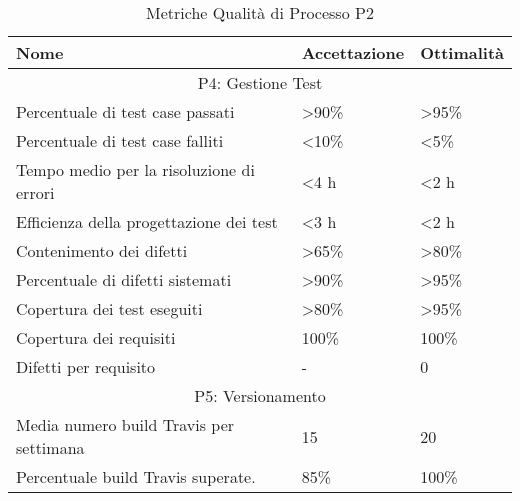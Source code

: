 \begin{table}[!htpb]
	\centering
	\renewcommand{\arraystretch}{2} 
		\begin{tabular}{|p{8cm}|p{3.5cm}|p{3.5cm}|}
		\hline
		\rowcolor{orange!50} 
		\textbf{Nome} & \textbf{Accettazione} & \textbf{Ottimalità} \\
		\hline
		\multicolumn{3}{|c|}{P4: Gestione Test} \\
		\hline 
		Percentuale di test case passati        & >90\%     & >95\%   \\
		\hline
			Percentuale di test case falliti        & <10\%     & <5\%   \\
		\hline
		Tempo medio per la risoluzione di errori
		& <4 h      & <2 h   \\
		\hline
		Efficienza della progettazione dei test & <3 h      & <2 h  \\
		\hline
			Contenimento dei difetti                & >65\%     & >80\%  \\
		\hline
		Percentuale di difetti sistemati        & >90\%     & >95\%  \\
		\hline
		Copertura dei test eseguiti             & >80\%     & >95\%  \\
		\hline
		Copertura dei requisiti                 & 100\%     & 100\%  \\
		\hline
		Difetti per requisito                   & -         & 0   \\
		\hline
		\multicolumn{3}{|c|}{P5: Versionamento} \\
		\hline
		Media numero build Travis per settimana & 15 & 20 \\
		\hline
		Percentuale build Travis superate. & 85\% & 100\% \\
		\hline
	\end{tabular}
	\caption{Metriche Qualità di Processo P2}
\end{table}
\clearpage
